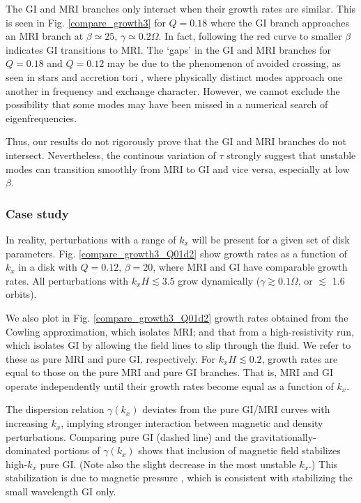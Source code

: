 The GI and MRI branches only interact when their growth rates
are similar. This is seen in Fig. \ref{compare_growth3} for $Q=0.18$
where the GI branch approaches an MRI branch at $\beta\simeq 25,\,
\gamma\simeq 0.2\Omega$. In fact, following the red curve to smaller
$\beta$ indicates GI transitions to MRI. The
`gaps' in the GI and MRI branches for $Q=0.18$ and $Q=0.12$ may be due
to the phenomenon of avoided crossing, as seen in stars
\citep[e.g.][]{aizenman77} and accretion tori
\citep[e.g.][]{christo93}, where physically distinct modes approach
one another in frequency and exchange character. However, we cannot
exclude the possibility  that some modes may have been missed in a 
numerical search of eigenfrequencies.  

Thus, our results do not rigorously prove that the GI and MRI branches
do not intersect.  Nevertheless, the continous variation of $\tau$
strongly suggest that unstable modes can transition smoothly from 
MRI to GI and vice versa, especially at low $\beta$.     

\subsubsection{Case study} 
In reality, perturbations with a range of $k_x$ will be present for a
given set of disk parameters. Fig. \ref{compare_growth3_Q01d2} show
growth rates as a function of $k_x$ in a disk with
$Q=0.12,\,\beta=20$, where MRI and GI have comparable growth
rates. All perturbations with $k_xH \lesssim 3.5$ grow dynamically
($\gamma\gtrsim 0.1\Omega$, or $\lesssim$ 1.6 orbits).    

We also plot in Fig. \ref{compare_growth3_Q01d2} growth rates obtained 
from the Cowling approximation, which isolates MRI; and that from a
high-resistivity run, which isolates GI by allowing the field lines to
slip through the fluid. We refer to these as  
pure MRI and pure GI, respectively.  
For $k_xH\lesssim 0.2$, growth rates are equal to
those on the pure MRI and pure GI branches. That is, MRI and GI
operate independently until their growth rates become equal as a
function of $k_x$.  

The dispersion relation $\gamma(k_x)$ deviates from the
pure GI/MRI curves with increasing $k_x$, implying stronger interaction between
magnetic and density perturbations. Comparing pure GI (dashed line)
and the gravitationally-dominated portions of $\gamma(k_x)$ shows that 
inclusion of magnetic field stabilizes high-$k_x$ pure GI. (Note also
the slight decrease in the most unstable $k_x$.) %
This stabilization is due to magnetic pressure \citep{lizano10}, which
is consistent with stabilizing the small wavelength GI only.    

